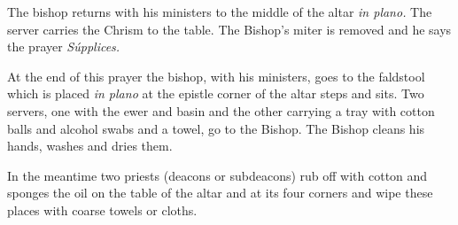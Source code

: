 \documentclass[letterpaper]{report}
\begin{document}
{    \rubric The bishop returns with his ministers to the middle of the altar
    \textit{in plano.} The server carries the Chrism to the table. The Bishop's
    miter is removed and he says the prayer \textit{Súpplices.}

    \rubric At the end of this prayer the bishop, with his ministers, goes to the
    faldstool which is placed \textit{in plano} at the epistle corner of the altar
    steps and sits. Two servers, one with the ewer and basin and the other carrying
    a tray with cotton balls and alcohol swabs and a towel, go to the Bishop. The
    Bishop cleans his hands, washes and dries them.

    In the meantime two priests (deacons or subdeacons) rub off with cotton and
    sponges the oil on the table of the altar and at its four corners and wipe
    these places with coarse towels or cloths.

}
\end{document}
